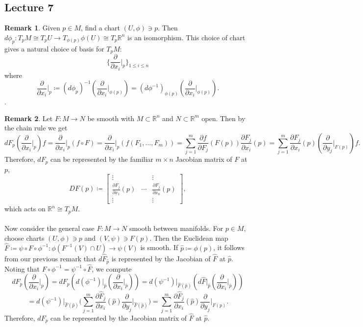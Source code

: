 \documentclass[10pt,letterpaper,cm]{nupset}
\theoremstyle{definition}
\newtheorem{remark}{Remark}
\newcommand{\R}{\mathbb R}
\newcommand{\1}{\mathbf{1}}
\newcommand{\0}{\vec 0}
\begin{document}
\subsection{Lecture 7}

\begin{remark}
Given $p\in M$, find a chart $(U, \phi)\ni p$. Then $d\phi_p : T_pM \cong T_pU\to T_{\phi(p)}\phi(U) \cong T_p \R^n$ is an isomorphism. This choice of chart gives a natural choice of basis for $T_pM$: $$\{\frac{\partial}{\partial{x_i}}\rvert_{p} \}_{1\leq i \leq n}$$ where $$\frac{\partial}{\partial{x_i}}\rvert_{p}\coloneqq  (d\phi_p)^{-1}(\frac{\partial}{\partial{x_i}}\rvert_{\phi(p)}) = (d\phi^{-1})_{\phi(p)}(\frac{\partial}{\partial{x_i}}\rvert_{\phi(p)}).$$.
\end{remark}

\begin{remark}
Let $F: M \to N$ be smooth with $M\subset \R^n$ and $N \subset \R^m$ open. Then by the chain rule we get 
$$dF_p(\frac{\partial}{\partial{x_i}}\rvert_{p})f = \frac{\partial}{\partial{x_i}}\rvert_{p}(f \circ F) = \frac{\partial}{\partial{x_i}}\rvert_{p}(f(F_1, \ldots, F_m)) =\sum_{j=1}^m  \frac{\partial{f}}{\partial{F_j}}(F(p))\frac{\partial{F_j}}{\partial{x_i}}(p)= \sum_{j=1}^m \frac{\partial{F_j}}{\partial{x_i}}(p) (\frac{\partial}{\partial{y_j}}\rvert_{F(p)})f.$$ Therefore, $dF_p$ can be represented by the familiar $m\times n$ Jacobian matrix of $F$ at $p$, 
 $$DF(p) \coloneqq  \begin{bmatrix}  \vdots & & \vdots \\ \frac{\partial{F_j}}{\partial{x_1}}(p)  & \cdots & \frac{\partial{F_j}}{\partial{x_n}}(p)  \\ \vdots & & \vdots  
\end{bmatrix},$$ which acts on $\R^n \cong T_pM$.
\\ \\
Now consider the general case $F: M \to N$ smooth between manifolds. For $p \in M$, choose charts $(U, \phi) \ni p$ and $(V, \psi) \ni F(p)$. Then the Euclidean map $\hat{F}\coloneqq  \psi \circ F \circ \phi^{-1} : \phi(F^{-1}(V) \cap U) \to \psi(V)$ is smooth. If $\hat{p}\coloneqq  \phi(p)$, it follows from our previous remark that $d\hat{F}_{\hat{p}}$ is represented by the Jacobian of $\hat{F}$ at $\hat{p}$. Noting that $F \circ \phi^{-1} = \psi^{-1} \circ \hat{F}$, we compute
$$dF_p(\frac{\partial}{\partial{x_i}}\rvert_p) =  dF_p(d(\phi^{-1})\rvert_{\hat{p}}(\frac{\partial}{\partial{x_i}}\rvert_{\hat{p}})) = d(\psi^{-1})\rvert_{\hat{F}(\hat{p})}(d\hat{F}\rvert_{\hat{p}}(\frac{\partial}{\partial{x_i}}\rvert_{\hat{p}}))$$
$$= d(\psi^{-1})\rvert_{\hat{F}(\hat{p})}\big(\sum_{j=1}^m \frac{\partial{\hat{F}_j}}{\partial{x_i}}(\hat{p})\frac{\partial}{\partial{y_j}}\rvert_{\hat{F}(\hat{p})}\big) = 
\sum_{j=1}^m \frac{\partial{\hat{F}_j}}{\partial{x_i}}(\hat{p})\frac{\partial}{\partial{y_j}}\rvert_{F(p)}.
$$
Therefore, $dF_p$ can be represented by the Jacobian matrix of $\hat{F}$ at $\hat{p}$. 
\end{remark}
\end{document}
